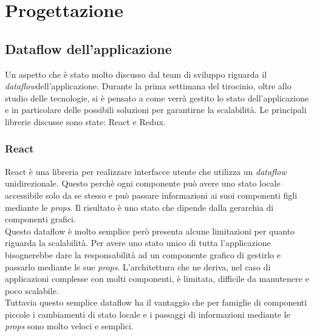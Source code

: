 
\chapter{Progettazione}
\label{cap:progettazione}


\section{Dataflow dell'applicazione}
Un aspetto che è stato molto discusso dal team di sviluppo riguarda il \emph{dataflow}\glosp dell'applicazione. Durante la prima settimana del tirocinio, oltre allo studio delle tecnologie, si è pensato a come verrà gestito lo stato dell'applicazione e in particolare delle possibili soluzioni per garantirne la scalabilità. Le principali librerie discusse sono state: React e Redux.

\subsection{React}
React è una libreria per realizzare interfacce utente che utilizza un \emph{dataflow} unidirezionale. Questo perchè ogni componente può avere uno stato locale accessibile solo da se stesso e può passare informazioni ai suoi componenti figli mediante le \emph{props}\glo. Il risultato è uno stato che dipende dalla gerarchia di componenti grafici. \\
Questo dataflow è molto semplice però presenta alcune limitazioni per quanto riguarda la scalabilità. Per avere uno stato unico di tutta l'applicazione bisognerebbe dare la responsabilità ad un componente grafico di gestirlo e passarlo mediante le sue \emph{props}. L'architettura che ne deriva, nel caso di applicazioni complesse con molti componenti, è limitata, difficile da manutenere e poco scalabile. \\
Tuttavia questo semplice dataflow ha il vantaggio che per famiglie di componenti piccole i cambiamenti di stato locale e i passaggi di informazioni mediante le \emph{props} sono molto veloci e semplici.

